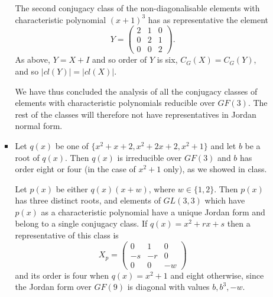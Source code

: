 \documentclass[11pt]{article} \usepackage{amssymb}
\begin{document}
\begin{enumerate}
\begin{enumerate}
\begin{itemize}
        The second conjugacy class of the non-diagonalisable elements with 
        characteristic polynomial
        $(x+1)^3$ has as representative the element
        \begin{equation*}
          Y=
          \begin{pmatrix}
            2&1  &0 \\ 
            0&2  &1 \\ 
            0&0  &2 
          \end{pmatrix}.
        \end{equation*}
        As above, $Y=X+I$ and so order of $Y$ is six,
        $C_G(X)=C_G(Y)$, and so $|cl(Y)|=|cl(X)|$.
        

        We have thus concluded the analysis of all the
        conjugacy classes of elements with characteristic polynomials 
        reducible over $GF(3)$. The rest of the classes will therefore not have
        representatives in Jordan normal form.

      \item
        Let $q(x)$ be one of $\{x^2+x+2,x^2+2x+2,x^2+1\}$ and let $b$ be a 
        root of
        $q(x)$. Then $q(x)$ is irreducible over $GF(3)$ and $b$ has order
        eight or four (in the case of $x^2+1$ only), as we showed in class. 

        Let $p(x)$ be either $q(x)(x+w)$, where $w\in\{1,2\}$. 
        Then $p(x)$ has three distinct roots, and elements of
        $GL(3,3)$ which have $p(x)$ as a characteristic polynomial have a
        unique Jordan form and belong to a single conjugacy class. 
        If $q(x)=x^2+rx+s$ then a
        representative of this class is
        \begin{equation*}
          X_p=\begin{pmatrix}
            0 & 1 & 0\\
            -s & -r & 0\\
            0 & 0 & -w
            \end{pmatrix}
        \end{equation*}
        and its order is four when $q(x)=x^2+1$ and eight otherwise, since
        the Jordan form over $GF(9)$ is diagonal with values $b,b^3,-w$.
        

\end{itemize}
\end{enumerate}
\end{enumerate}
\end{document}
